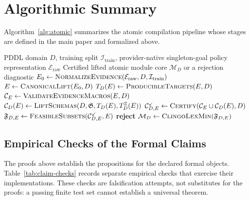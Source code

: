 \section{Algorithmic Summary}

Algorithm~\ref{alg:atomic} summarizes the atomic compilation pipeline whose
stages are defined in the main paper and formalized above.

\begin{algorithm}[htbp]
\caption{Compile the Certified Lifted Atomic Module Core}
\label{alg:atomic}
\begin{algorithmic}[1]
\REQUIRE PDDL domain $D$, training split $\mathcal I_{\mathrm{train}}$,
provider-native singleton-goal policy representation $\mathcal E_{\mathrm{raw}}$
\ENSURE Certified lifted atomic module core $\mathcal M_D$ or a rejection diagnostic
\STATE $E_0\leftarrow\textsc{NormalizeEvidence}(\mathcal E_{\mathrm{raw}},D,\mathcal I_{\mathrm{train}})$
\STATE $E\leftarrow\textsc{CanonicalLift}(E_0,D)$
\STATE $T_D(E)\leftarrow\textsc{ProducibleTargets}(E,D)$
\STATE $\mathcal C_E\leftarrow\textsc{ValidateEvidenceMacros}(E,D)$
\STATE $\mathcal C_D(E)\leftarrow
\textsc{LiftSchemas}(D,\mathfrak G,T_D(E),T_D^{\mathbb Z}(E))$
\STATE $\mathcal C^{\checkmark}_{D,E}\leftarrow
\textsc{Certify}(\mathcal C_E\cup\mathcal C_D(E),D)$
\STATE $\mathfrak F_{D,E}\leftarrow
\textsc{FeasibleSubsets}(\mathcal C^{\checkmark}_{D,E},E)$
  \STATE \textbf{reject}
\ENDIF
\RETURN $\mathcal M_D\leftarrow
\textsc{ClingoLexMin}(\mathfrak F_{D,E})$
\end{algorithmic}
\end{algorithm}

\subsection{Empirical Checks of the Formal Claims}

The proofs above establish the propositions for the declared formal objects.
Table~\ref{tab:claim-checks} records separate empirical checks that exercise
their implementations. These checks are falsification attempts, not substitutes
for the proofs: a passing finite test set cannot establish a universal theorem.

